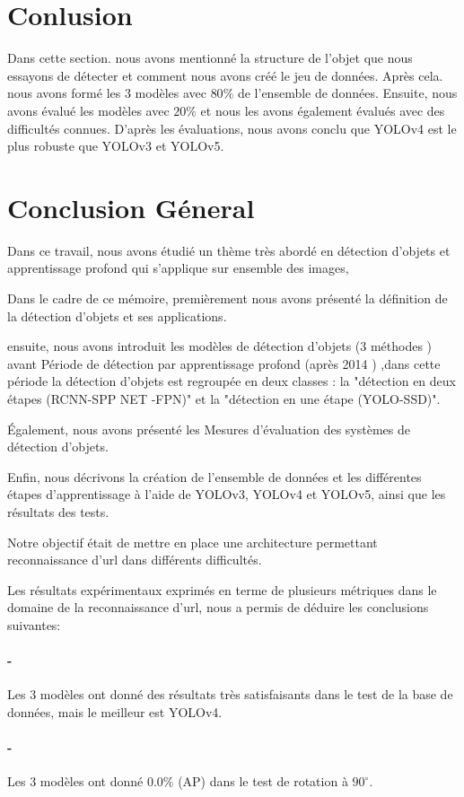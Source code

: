 \section{Conlusion}
Dans cette section. nous avons mentionné la structure de l'objet que nous essayons de détecter et comment nous avons créé le jeu de données. Après cela. nous avons formé les 3 modèles avec $80\%$ de l'ensemble de données. Ensuite, nous avons évalué les modèles avec $20\%$ et nous les avons également évalués avec des difficultés connues.
D'après les évaluations, nous avons conclu que YOLOv4 est le plus robuste que YOLOv3 et YOLOv5.

\newpage
\section{Conclusion Géneral}
Dans ce travail, nous avons étudié un thème très abordé en détection d'objets et apprentissage profond qui s'applique  sur ensemble des images, 

Dans le cadre de ce mémoire, premièrement nous avons présenté la  définition  de la détection  d'objets  et ses  applications.

ensuite, nous avons introduit  les modèles de détection d'objets  (3 méthodes ) avant Période de détection par apprentissage profond (après 2014 ) ,dans cette période  la détection d'objets est regroupée en deux classes : la "détection en deux étapes (RCNN-SPP NET -FPN)" et la "détection en une étape (YOLO-SSD)".

Également, nous avons présenté  les Mesures d'évaluation des systèmes de détection d'objets. 

Enfin, nous décrivons la création de l'ensemble de données et les différentes étapes d'apprentissage à l'aide de YOLOv3, YOLOv4 et YOLOv5, ainsi que les résultats des tests.

Notre objectif était de mettre en place une architecture permettant reconnaissance d’url dans différents difficultés.

Les résultats expérimentaux exprimés en terme de plusieurs métriques dans le domaine   de la reconnaissance  d’url, nous a permis de déduire les conclusions suivantes:
\paragraph{-} Les 3 modèles ont donné des résultats très satisfaisants dans le test de la base de données, mais le meilleur est YOLOv4. 
\paragraph{-} Les 3 modèles ont donné $0.0\%$ (AP) dans le test de rotation à $90^\circ$.
